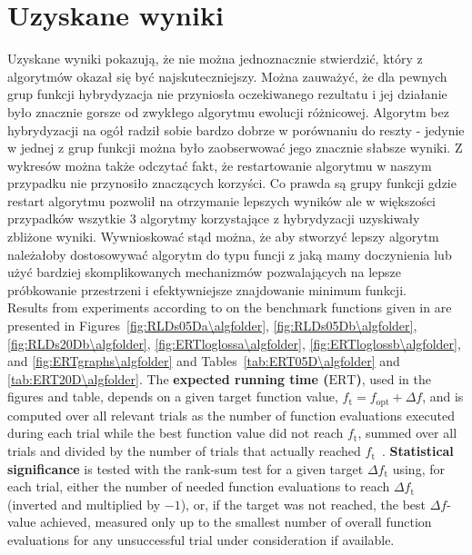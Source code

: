 \documentclass{article}
\newcommand{\ERT}{\ensuremath{\mathrm{ERT}}}
\newcommand{\Df}{\ensuremath{\Delta f}}
\newcommand{\fopt}{\ensuremath{f_\mathrm{opt}}}
\newcommand{\ftarget}{\ensuremath{f_\mathrm{t}}}
\begin{document}
\section{Uzyskane wyniki}
Uzyskane wyniki pokazują, że nie można jednoznacznie stwierdzić, który z algorytmów okazał się być najskuteczniejszy. Można zauważyć, że dla pewnych grup funkcji hybrydyzacja nie przyniosła oczekiwanego rezultatu i jej działanie było znacznie gorsze od zwykłego algorytmu ewolucji różnicowej. Algorytm bez hybrydyzacji na ogół radził sobie bardzo dobrze w porównaniu do reszty -  jedynie w jednej z grup funkcji można było zaobserwować jego znacznie słabsze wyniki. Z wykresów można także odczytać fakt, że restartowanie algorytmu w naszym przypadku nie przynosiło znaczących korzyści. Co prawda są grupy funkcji gdzie restart algorytmu pozwolił na otrzymanie lepszych wyników ale w większości przypadków wszytkie 3 algorytmy korzystające z hybrydyzacji uzyskiwały zbliżone wyniki. Wywnioskować stąd można, że aby stworzyć lepszy algorytm należałoby dostosowywać algorytm do typu funcji z jaką mamy doczynienia lub użyć bardziej skomplikowanych mechanizmów pozwalających na lepsze próbkowanie przestrzeni i efektywniejsze znajdowanie minimum funkcji.\\
Results from experiments according to \cite{hansen2010exp} on the
benchmark functions given in \cite{wp200901_2010,hansen2010fun} are presented
in Figures~\ref{fig:RLDs05Da\algfolder}, \ref{fig:RLDs05Db\algfolder},
\ref{fig:RLDs20Db\algfolder},
\ref{fig:ERTloglossa\algfolder}, \ref{fig:ERTloglossb\algfolder},
and \ref{fig:ERTgraphs\algfolder} and 
Tables~\ref{tab:ERT05D\algfolder} and \ref{tab:ERT20D\algfolder}.
The \textbf{expected running time (\ERT)}, used in the figures and table,
depends on a given target function value, $\ftarget=\fopt+\Df$, and is computed
over all relevant trials as the number of function evaluations executed during
each trial while the best function value did not reach \ftarget, summed over
all trials and divided by the number of trials that actually reached \ftarget\
\cite{hansen2010exp,price1997dev}.
\textbf{Statistical significance} is tested with the rank-sum test for a given
target $\Delta\ftarget$ using, for each trial, either the number of needed
function evaluations to reach $\Delta\ftarget$ (inverted and multiplied by
$-1$), or, if the target was not reached, the best $\Df$-value achieved,
measured only up to the smallest number of overall function evaluations for any
unsuccessful trial under consideration if available.
\end{document}
